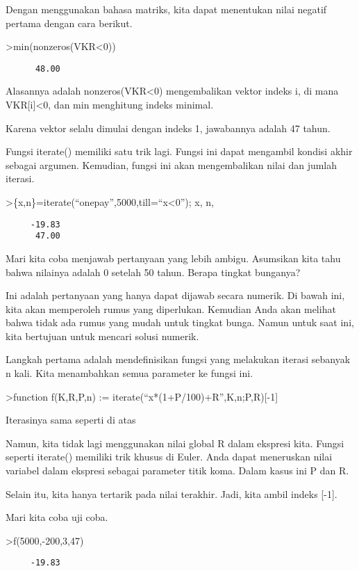 \documentclass[
]{book}
\begin{document}
Dengan menggunakan bahasa matriks, kita dapat menentukan nilai negatif pertama dengan cara berikut.

\textgreater min(nonzeros(VKR\textless0))

\begin{verbatim}
      48.00 
\end{verbatim}

Alasannya adalah nonzeros(VKR\textless0) mengembalikan vektor indeks i, di mana VKR{[}i{]}\textless0, dan min menghitung indeks minimal.

Karena vektor selalu dimulai dengan indeks 1, jawabannya adalah 47 tahun.

Fungsi iterate() memiliki satu trik lagi. Fungsi ini dapat mengambil kondisi akhir sebagai argumen. Kemudian, fungsi ini akan mengembalikan nilai dan jumlah iterasi.

\textgreater\{x,n\}=iterate(``onepay'',5000,till=``x\textless0''); x, n,

\begin{verbatim}
     -19.83 
      47.00 
\end{verbatim}

Mari kita coba menjawab pertanyaan yang lebih ambigu. Asumsikan kita tahu bahwa nilainya adalah 0 setelah 50 tahun. Berapa tingkat bunganya?

Ini adalah pertanyaan yang hanya dapat dijawab secara numerik. Di bawah ini, kita akan memperoleh rumus yang diperlukan. Kemudian Anda akan melihat bahwa tidak ada rumus yang mudah untuk tingkat bunga. Namun untuk saat ini, kita bertujuan untuk mencari solusi numerik.

Langkah pertama adalah mendefinisikan fungsi yang melakukan iterasi sebanyak n kali. Kita menambahkan semua parameter ke fungsi ini.

\textgreater function f(K,R,P,n) := iterate(``x*(1+P/100)+R'',K,n;P,R){[}-1{]}

Iterasinya sama seperti di atas

Namun, kita tidak lagi menggunakan nilai global R dalam ekspresi kita. Fungsi seperti iterate() memiliki trik khusus di Euler. Anda dapat meneruskan nilai variabel dalam ekspresi sebagai parameter titik koma. Dalam kasus ini P dan R.

Selain itu, kita hanya tertarik pada nilai terakhir. Jadi, kita ambil indeks {[}-1{]}.

Mari kita coba uji coba.

\textgreater f(5000,-200,3,47)

\begin{verbatim}
     -19.83 
\end{verbatim}
\end{document}
